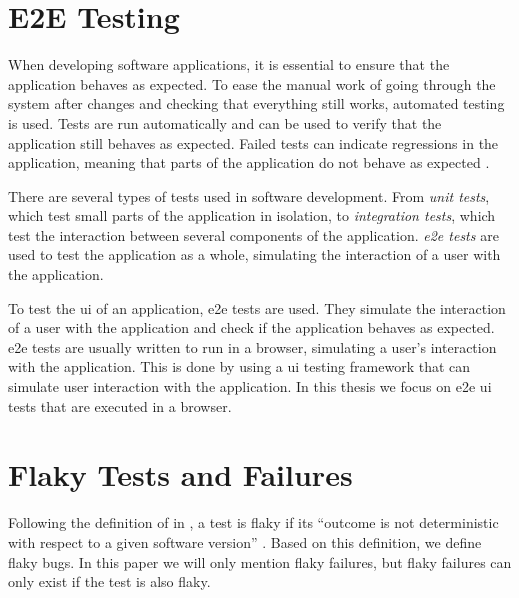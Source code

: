 \section{E2E Testing}

When developing software applications, it is essential to ensure that the application behaves as expected.
To ease the manual work of going through the system after changes and checking that everything still works, automated testing is used.
Tests are run automatically and can be used to verify that the application still behaves as expected.
Failed tests can indicate regressions in the application, meaning that parts of the application do not behave as expected \autocite{lam_large-scale_2020, luo_empirical_2014,romano_empirical_2021}.

There are several types of tests used in software development.
From \emph{unit tests}, which test small parts of the application in isolation, to \emph{integration tests}, which test the interaction between several components of the application.
\emph{\ac{e2e} tests} are used to test the application as a whole, simulating the interaction of a user with the \autocite{jacob_schmitt_what_2022} application.

To test the \ac{ui} of an application, \ac{e2e} tests are used.
They simulate the interaction of a user with the application and check if the application behaves as expected.
\ac{e2e} tests are usually written to run in a browser, simulating a user's interaction with the application.
This is done by using a \ac{ui} testing framework that can simulate user interaction with the application.
In this thesis we focus on \ac{e2e} \ac{ui} tests that are executed in a browser.


\section{Flaky Tests and Failures}

Following the definition of \citeauthor*{luo_empirical_2014} in  \autocite{luo_empirical_2014}, a test is flaky if its \enquote{outcome is not deterministic with respect to a given software version} \autocite{luo_empirical_2014}.
Based on this definition, we define flaky bugs.
In this paper we will only mention flaky failures, but flaky failures can only exist if the test is also flaky.

